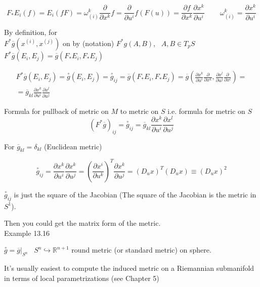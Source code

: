 \[
F_* E_i(f) = E_i(fF) = \omega^k_{(i)} \frac{ \partial }{ \partial x^k}f = \frac{ \partial }{ \partial u^i} f(F(u)) = \frac{ \partial f}{ \partial x^k } \frac{ \partial x^k }{ \partial u^i } \quad \quad \, \omega_{(i)}^k = \frac{ \partial x^k}{ \partial u^i }
\]

By definition, for  \\
\quad $F^*\overline{g}(x^{(i)}, x^{(j)})$ on by (notation) $F^*g(A,B)$, \, $A,B \in T_pS$ \\
\quad $F^*\overline{g}(E_i, E_j) = \overline{g}(F_* E_i, F_* E_j)$

\[
\begin{gathered}
  F^*\overline{g}(E_i,E_j) = \overset{\circ}{g}(E_i, E_j) = \overset{\circ}{g}_{ij} = \overline{g}(F_* E_i, F_* E_j) = \overline{g}{ \left( \frac{ \partial x^k}{ \partial u^i } \frac{ \partial }{ \partial x^k} , \frac{ \partial x^l }{ \partial u^j } \frac{ \partial }{ \partial x^l } \right) } = \\
  = \overline{g}_{kl} \frac{ \partial x^k}{ \partial u^i } \frac{ \partial x^l }{ \partial u^j }
\end{gathered}
\]

Formula for pullback of metric on $M$ to metric on $S$ i.e. formula for metric on $S$
\[
\boxed{ (F^* \overline{g} )_{ij} = \overset{\circ}{g}_{ij} = \overline{g}_{kl} \frac{ \partial x^k}{ \partial u^i } \frac{ \partial x^l }{ \partial u^j } }
\]

For $\overline{g}_{kl} = \delta_{kl}$ (Euclidean metric)

\[
\overset{\circ}{g}_{ij} = \frac{ \partial x^k}{ \partial u^i } \frac{ \partial x^k}{ \partial u^j } = \left( \frac{ \partial x^i }{ \partial u^k } \right)^T \frac{ \partial x^k}{ \partial u^j } = (D_u x)^T (D_u x) \equiv (D_u x)^2 
\]

$\overset{\circ}{g}_{ij}$ is just the square of the Jacobian (The square of the Jacobian is the metric in $S^1$).  

Then you could get the matrix form of the metric.  \\






Example 13.16

$\overset{ \circ}{g} = \left. \overline{g} \right|_{S^n}$  \quad \, $S^n \hookrightarrow \mathbb{R}^{n+1}$ round metric (or standard metric) on sphere. 




It's usually easiest to compute the induced metric on a Riemannian submanifold in terms of local parametrizations (see Chapter 5)


